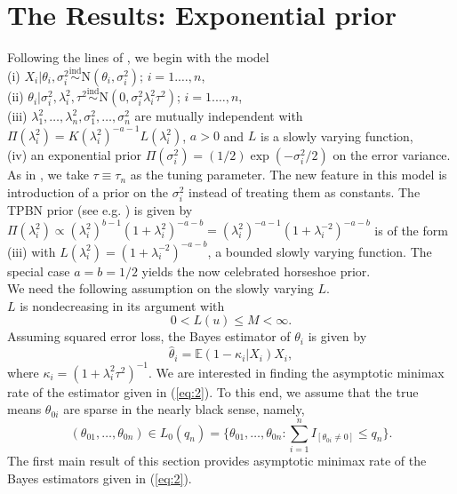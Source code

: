 \documentclass[sn-basic]{sn-jnl}%
\theoremstyle{thmstyleone}%
\begin{document}
\section{The Results: Exponential prior}\label{sec:results-exponential}

\noindent
Following the lines of \citet{ghosh2017}, we begin with the model\\
(i) $X_i|\theta_i,\sigma_i^2\stackrel{\mbox{ind}}
{\sim}\mbox{N}(\theta_i,\sigma_i^2)$;
$i=1.\ldots,n$,\\
(ii) $\theta_i|\sigma_i^2,\lambda_i^2,\tau^2\stackrel{\mbox{ind}}{\sim}
\mbox{N}(0,\sigma_i^2\lambda_i^2\tau^2)$; $i=1.\ldots,n$,\\
(iii) $\lambda_1^2,\ldots,\lambda_n^2,\sigma_1^2,\ldots,\sigma_n^2$ are mutually
independent with $\Pi(\lambda_i^2)=K(\lambda_i^2)^{-a-1}L(\lambda_i^2)$,
$a>0$ and $L$ is a slowly varying function,\\
(iv) an exponential prior $\Pi(\sigma_i^2)=(1/2)\exp(-\sigma_i^2/2)$ on the error variance.\\

\noindent
As in \citet{ghosh2017}, we take $\tau\equiv\tau_n$ as the tuning parameter. The new feature in this model is introduction of a prior on the $\sigma_i^2$
instead of treating them as constants. The TPBN prior (see e.g. \citet{ghosh2016}) is given by $\Pi(\lambda_i^2)\propto(\lambda_i^2)^{b-1}  
(1+\lambda_i^2)^{-a-b}=(\lambda_i^2)^{-a-1}(1+\lambda_i^{-2})^{-a-b}$ is of 
the form (iii) with $L(\lambda_i^2)=(1+\lambda_i^{-2})^{-a-b}$, a bounded slowly varying function. The special case $a=b=1/2$ yields the now celebrated 
horseshoe prior. \\

\noindent
We need the following assumption on the slowly varying $L$.\\

\noindent
$L$ is nondecreasing in its argument with
\begin{equation} 
0<L(u)\leq M<\infty.
\label{eq:1}
\end{equation}
Assuming squared error loss, the Bayes estimator of $\theta_i$ is given by
\begin{equation}
\hat{\theta}_i=\mathbb{E}(1-\kappa_i|X_i)X_i,
\label{eq:2}
\end{equation}
where $\kappa_i=(1+\lambda_i^2\tau^2)^{-1}$.
We are interested in finding the asymptotic minimax  rate of the estimator 
given in (\ref{eq:2}).
To this end, we assume that the true means $\theta_{0i}$ are sparse in the 
nearly black sense, namely,
\begin{equation}
(\theta_{01},\ldots,\theta_{0n})\in L_0(q_n)=
\{\theta_{01},\ldots,\theta_{0n}:\sum_{i=1}^n I_{[\theta_{0i}\neq 0]}\leq q_n\}.
\label{eq:3}
\end{equation}
The first main result of this section provides asymptotic minimax rate of
the Bayes estimators given in (\ref{eq:2}).\\
\end{document}
